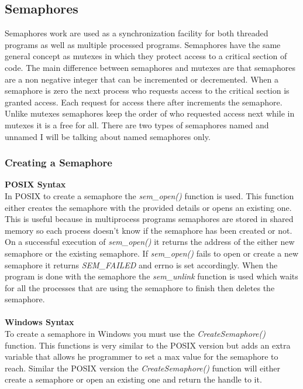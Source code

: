 \documentclass[letterpaper,10pt,notitlepage,fleqn]{article}
\begin{document}
\subsection{Semaphores}
Semaphores work are used as a synchronization facility for both threaded programs as well as multiple processed programs. Semaphores have the same general concept as mutexes in which they protect access to a critical section of code. The main difference between semaphores and mutexes are that semaphores are a non negative integer that can be incremented or decremented. When a semaphore is zero the next process who requests access to the critical section is granted access. Each request for access there after increments the semaphore. Unlike mutexes semaphores keep the order of who requested access next while in mutexes it is a free for all. There are two types of semaphores named and unnamed I will be talking about named semaphores only.

\subsubsection{Creating a Semaphore}
\textbf{POSIX Syntax} \\
In POSIX to create a semaphore the \textit{sem\_open()} function is used. This function either creates the semaphore with the provided details or opens an existing one. This is useful because in multiprocess programs semaphores are stored in shared memory so each process doesn’t know if the semaphore has been created or not. On a successful execution of \textit{sem\_open()} it returns the address of the either new semaphore or the existing semaphore. If \textit{sem\_open()} fails to open or create a new semaphore it returns \textit{SEM\_FAILED} and errno is set accordingly. When the program is done with the semaphore the \textit{sem\_unlink} function is used which waits for all the processes that are using the semaphore to finish then deletes the semaphore. \\ \\

\textbf{Windows Syntax} \\
To create a semaphore in Windows you must use the \textit{CreateSemaphore()} function. This functions is very similar to the POSIX version but adds an extra variable that allows he programmer to set a max value for the semaphore to reach. Similar the POSIX version the \textit{CreateSemaphore()} function will either create a semaphore or open an existing one and return the handle to it. 
\end{document}
